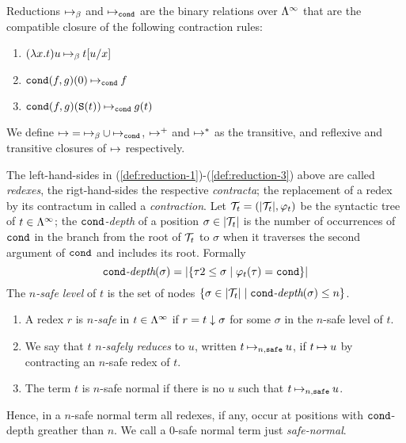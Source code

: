 \begin{definition}\label{def:reduction}
Reductions $\mathbin{\mapsto}_\beta$ and $\mathbin{\mapsto}_{\tt cond}$ are the binary relations over $\Lambda^\infty$ that are the compatible closure of 
the following contraction rules:

\begin{enumerate}
\item \label{def:reduction-1} $(\lambda x.t)u \mathbin{\mapsto}_\beta t[u/x]$
\item \label{def:reduction-2} ${\tt cond}(f,g)(0) \mathbin{\mapsto}_{\tt cond} f$
\item \label{def:reduction-3} ${\tt cond}(f,g)({\tt S} (t)) \mathbin{\mapsto}_{\tt cond} g(t)$
\end{enumerate}
We define $\mathbin{\mapsto} = \mathbin{\mapsto}_\beta \cup \mathbin{\mapsto}_{\tt cond}$, $\mathbin{\mapsto}^+$ and $\mathbin{\mapsto}^*$ as the transitive, and reflexive and transitive
closures of $\mathbin{\mapsto}$ respectively.
\end{definition}

The left-hand-sides in (\ref{def:reduction-1})-(\ref{def:reduction-3}) above are called {\em redexes}, the rigt-hand-sides the respective {\em contracta};
the replacement of a redex by its contractum in called a {\em contraction}.
Let ${\cal T}_t = (|{\cal T}_t|, \varphi_t)$ be the syntactic tree of $t\in \Lambda^\infty$;
the {\em ${\tt cond}$-depth} of a position $\sigma \in |{\cal T}_t|$ is the number of occurrences of ${\tt cond}$ 
in the branch from the root of ${\cal T}_t$ to $\sigma$ when it traverses the second argument of ${\tt cond}$ and includes its root.
Formally
\[\textit{${\tt cond}$-depth}(\sigma) = |\{ \tau 2 \leq \sigma \mid \varphi_t(\tau) = {\tt cond} \}|\]
The {\em $n$-safe level} of $t$ is the set of nodes $\{ \sigma \in |{\cal T}_t| \mid \textit{${\tt cond}$-depth}(\sigma) \leq n \}$.

\begin{definition}\label{def:n-safe}
\hfill
\begin{enumerate}
\item A redex $r$ is {\em $n$-safe} in $t \in \Lambda^\infty$ if $r = t \downarrow \sigma$ for some $\sigma$ in the $n$-safe level of $t$.

\item We say that $t$ {\em $n$-safely reduces} to $u$, written $t \mathbin{\mathbin{\mapsto}_{n,{\hbox{\scriptsize \tt safe}}}} u$, if $t \mathbin{\mapsto} u$ by contracting an $n$-safe
redex of $t$.

\item The term $t$ is $n$-safe normal if there is no $u$ such that $t \mathbin{\mathbin{\mapsto}_{n,{\hbox{\scriptsize \tt safe}}}} u$.
\end{enumerate}
\end{definition}

Hence, in a $n$-safe normal term all redexes, if any, occur at positions with ${\tt cond}$-depth greather than $n$. We call
a $0$-safe normal term just {\em safe-normal}.

